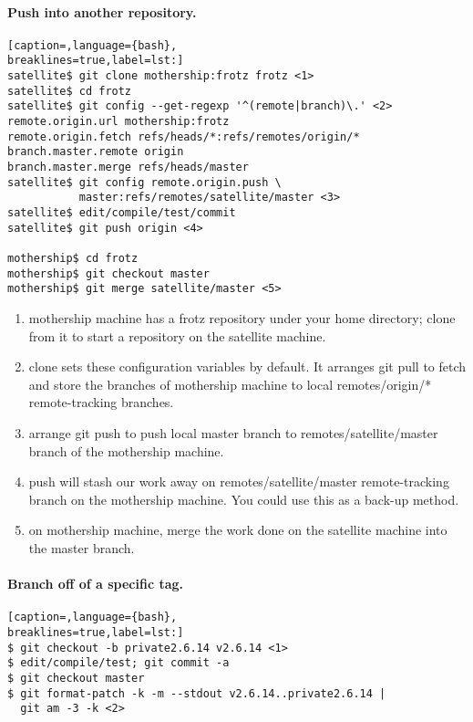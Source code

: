 \paragraph{Push into another repository.}
\lstset{basicstyle=\scriptsize, numbers=none, captionpos=b, tabsize=4}
\begin{lstlisting}[caption=,language={bash},
breaklines=true,label=lst:]
satellite$ git clone mothership:frotz frotz <1>
satellite$ cd frotz
satellite$ git config --get-regexp '^(remote|branch)\.' <2>
remote.origin.url mothership:frotz
remote.origin.fetch refs/heads/*:refs/remotes/origin/*
branch.master.remote origin
branch.master.merge refs/heads/master
satellite$ git config remote.origin.push \
           master:refs/remotes/satellite/master <3>
satellite$ edit/compile/test/commit
satellite$ git push origin <4>

mothership$ cd frotz
mothership$ git checkout master
mothership$ git merge satellite/master <5>
\end{lstlisting}

\begin{enumerate}
\setlength{\itemsep}{0cm}
\setlength{\parskip}{0cm}
\item mothership machine has a frotz repository under your home directory;
clone from it to start a repository on the satellite machine.
\item clone sets these configuration variables by default. It arranges git pull
to fetch and store the branches of mothership machine to local remotes/origin/*
remote-tracking branches.
\item arrange git push to push local master branch to remotes/satellite/master
branch of the mothership machine.
\item push will stash our work away on remotes/satellite/master remote-tracking
branch on the mothership machine. You could use this as a back-up method.
\item on mothership machine, merge the work done on the satellite machine into
the master branch.
\end{enumerate}

\paragraph{Branch off of a specific tag.}
\lstset{basicstyle=\scriptsize, numbers=none, captionpos=b, tabsize=4}
\begin{lstlisting}[caption=,language={bash},
breaklines=true,label=lst:]
$ git checkout -b private2.6.14 v2.6.14 <1>
$ edit/compile/test; git commit -a
$ git checkout master
$ git format-patch -k -m --stdout v2.6.14..private2.6.14 |
  git am -3 -k <2>
\end{lstlisting}

